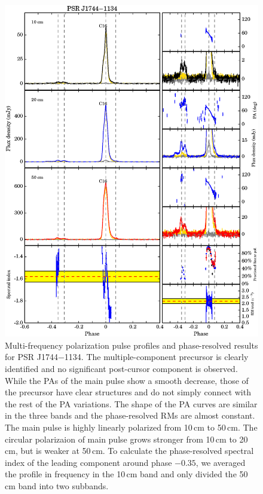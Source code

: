 \documentclass[useAMS,usenatbib]{mn2e}
\begin{document}
\begin{appendix}
\begin{figure}
\begin{center}
\includegraphics[width=6 in]{1744.ps}
\caption{Multi-frequency polarization pulse profiles and phase-resolved results for PSR J1744$-$1134. 
The multiple-component precursor is clearly identified and no significant 
post-cursor component is observed.
%
While the PAs of the main pulse show a smooth decrease, those of the precursor 
have clear structures and do not simply connect with the rest of the PA 
variations.
%
The shape of the PA curves are similar in the three bands and the phase-resolved 
RMs are almost constant.
%
The main pulse is highly linearly polarized from 10\,cm to 50\,cm. 
The circular polarizaion of main pulse grows stronger from 10\,cm to 20\,cm, 
but is weaker at 50\,cm.
%
To calculate the phase-resolved spectral index of the leading component
around phase $-0.35$, we averaged the profile in frequency in the 10\,cm 
band and only divided the 50\,cm band into two subbands.
}
\label{1744}
\end{center}
\end{figure}


\end{appendix}
\end{document}
